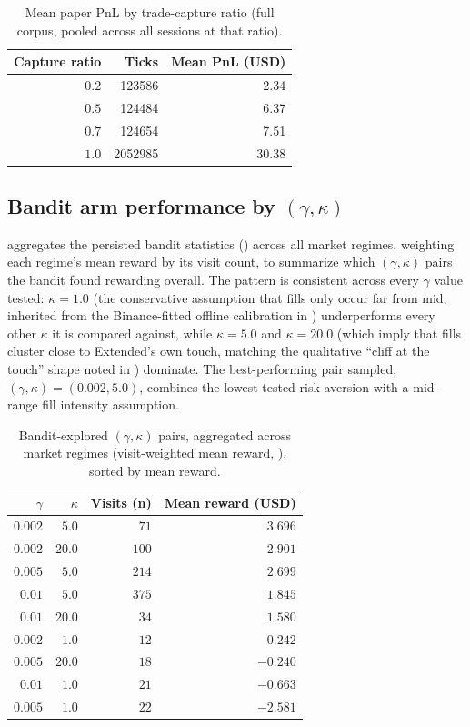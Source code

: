 \documentclass[11pt,a4paper]{article}
\begin{document}
\begin{table}[htbp]
\centering
\small
\caption{Mean paper PnL by trade-capture ratio (full corpus, pooled across all sessions at that
ratio).}
\label{tab:capture-ratio}
\begin{tabular}{@{}rrr@{}}
\toprule
\textbf{Capture ratio} & \textbf{Ticks} & \textbf{Mean PnL (USD)} \\
\midrule
$0.2$ & \num{123586} & \num{2.34} \\
$0.5$ & \num{124484} & \num{6.37} \\
$0.7$ & \num{124654} & \num{7.51} \\
$1.0$ & \num{2052985} & \num{30.38} \\
\bottomrule
\end{tabular}
\end{table}

\subsection{Bandit arm performance by $(\gamma,\kappa)$}

 aggregates the persisted bandit statistics () across all
market regimes, weighting each regime's mean reward by its visit count, to summarize which
$(\gamma,\kappa)$ pairs the bandit found rewarding overall. The pattern is consistent across
every $\gamma$ value tested: $\kappa=1.0$ (the conservative assumption that fills only occur far
from mid, inherited from the Binance-fitted offline calibration in )
underperforms every other $\kappa$ it is compared against, while $\kappa=5.0$ and $\kappa=20.0$
(which imply that fills cluster close to Extended's own touch, matching the qualitative ``cliff at
the touch'' shape noted in ) dominate. The best-performing pair sampled,
$(\gamma,\kappa)=(0.002,5.0)$, combines the lowest tested risk aversion with a mid-range fill
intensity assumption.

\begin{table}[htbp]
\centering
\small
\caption{Bandit-explored $(\gamma,\kappa)$ pairs, aggregated across market regimes (visit-weighted
mean reward, ), sorted by mean reward.}
\label{tab:bandit-arms}
\begin{tabular}{@{}rrrr@{}}
\toprule
$\gamma$ & $\kappa$ & \textbf{Visits (n)} & \textbf{Mean reward (USD)} \\
\midrule
$0.002$ & $5.0$  & $71$  & $3.696$ \\
$0.002$ & $20.0$ & $100$ & $2.901$ \\
$0.005$ & $5.0$  & $214$ & $2.699$ \\
$0.01$  & $5.0$  & $375$ & $1.845$ \\
$0.01$  & $20.0$ & $34$  & $1.580$ \\
$0.002$ & $1.0$  & $12$  & $0.242$ \\
$0.005$ & $20.0$ & $18$  & $-0.240$ \\
$0.01$  & $1.0$  & $21$  & $-0.663$ \\
$0.005$ & $1.0$  & $22$  & $-2.581$ \\
\bottomrule
\end{tabular}
\end{table}
\end{document}
